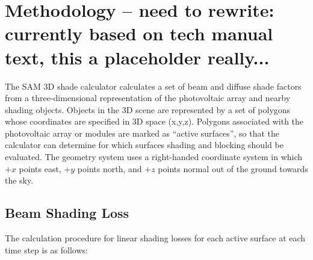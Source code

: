 \documentclass[twocolumn,10pt]{asme2ej}
\begin{document}
\section{Methodology -- need to rewrite: currently based on tech manual text, this a placeholder really...}

The SAM 3D shade calculator calculates a set of beam and diffuse shade factors from a three-dimensional representation of the photovoltaic array and nearby shading objects.  Objects in the 3D scene are represented by a set of polygons whose coordinates are specified in 3D space (x,y,z).  Polygons associated with the photovoltaic array or modules are marked as ``active surfaces'', so that the calculator can determine for which surfaces shading and blocking should be evaluated.  The geometry system uses a right-handed coordinate system in which $+x$ points east, $+y$ points north, and $+z$ points normal out of the ground towards the sky. 

\subsection{Beam Shading Loss}

The calculation procedure for linear shading losses for each active surface at each time step is as follows:
\end{document}
